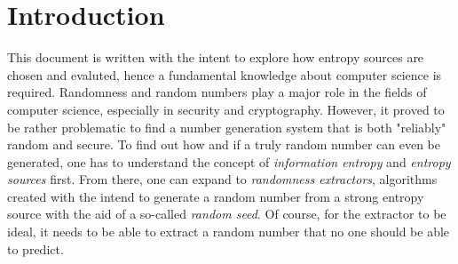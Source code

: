 \section{Introduction}
This document is written with the intent to explore how entropy sources are chosen and evaluted, hence a fundamental knowledge about computer science is required.
\newline
\newline
Randomness and random numbers play a major role in the fields of computer science, especially in security and cryptography. However, it proved to be rather problematic to find a number generation system that is both "reliably" random and secure. To find out how and if a truly random number can even be generated, one has to understand the concept of \emph{information entropy} and \emph{entropy sources} first.
\newline
From there, one can expand to \emph{randomness extractors}, algorithms created with the intend to generate a random number from a strong entropy source with the aid of a so-called \emph{random seed}. Of course, for the extractor to be ideal, it needs to be able to extract a random number that no one should be able to predict.